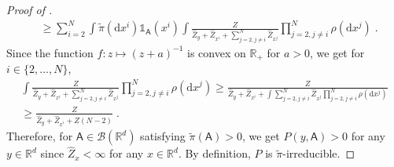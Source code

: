 \documentclass{article}
\def\rmd{\operatorname{d}\hspace{-2pt}}
\def\rset{\mathbb{R}}
\def\rmd{\mathrm{d}}
\def\eqsp{\,}
\def\msa{\mathsf{A}}
\def\eqsp{\;}
\newcommand{\1}{\mathds{1}}
\newcommand{\indi}[1]{\1_{#1}}
\def\proposal{\rho}
\def\const{Z}
\newcommand{\estConstC}[1]{\widehat{Z}_{#1}}
\def\tpi{\tilde{\pi}}
\def\msa{\mathsf{A}}
\def\mcbb{\mathcal{B}}  %
\newcommand{\mcb}[1]{\mathcal{B}(#1)}
\def\rset{\mathbb{R}}
\def\rmd{\mathrm{d}}
\begin{document}
\begin{proof}[Proof of ]
\begin{align*}
               &\geq\sum_{i=2}^N\int\tpi(\rmd x^i)\indi{\msa}(x^i)\int \frac{ \const}{\estConstC{y} +\estConstC{x^i} +\sum_{j=2, j\neq i}^N \estConstC{x^j}} \prod_{j=2, j\neq i}^N\proposal(\rmd x^j) \eqsp.
  \end{align*}
Since the function $f\colon z\mapsto (z+a)^{-1}$ is convex on $\rset_+$ for $a>0$, we get for $i\in\{2,\dots, N\}$,
  \begin{multline}
  \label{eq:convex_trick_i-SIR}
    \int \frac{\const}{\estConstC{y} + \estConstC{x^i} +\sum_{j=2, j\neq i}^N \estConstC{x^j}} \prod_{j=2, j\neq i}^N\proposal(\rmd x^j)
     \geq \frac{\const}{\estConstC{y} + \estConstC{x^i} +\int\sum_{j=2, j\neq i}^N \estConstC{x^j}\prod_{j=2, j\neq i}^N\proposal(\rmd x^j)}  \\
     \geq \frac{\const}{\estConstC{y} + \estConstC{x^i} + \const(N-2)}\eqsp.
  \end{multline}
  Therefore, for $\msa \in \mcbb(\rset^d)$ satisfying $\tpi(\msa)>0$, we get $P(y, \msa)>0$ for any $y \in \rset^d$ since $\estConstC{x} < \infty$ for any $x \in\rset^d$. By definition, $P$ is $\tpi$-irreducible.


\end{proof}
\end{document}
